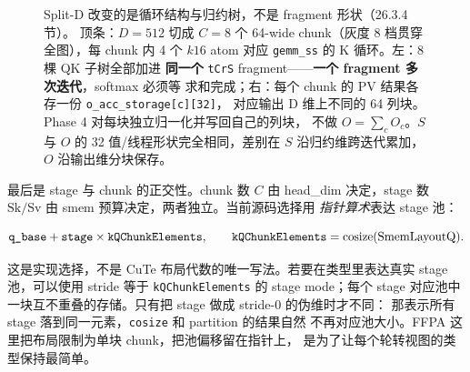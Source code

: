\begin{figure}[H]
\caption{Split-D 改变的是循环结构与归约树，不是 fragment 形状（26.3.4 节）。
顶条：$D=512$ 切成 $C=8$ 个 64-wide chunk（灰度 8 档贯穿全图），每 chunk 内
4 个 $k16$ atom 对应 \texttt{gemm\_ss} 的 K 循环。左：8 棵 QK 子树全部加进
\textbf{同一个} \texttt{tCrS} fragment——\textbf{一个 fragment 多次迭代}，softmax 必须等
求和完成；右：每个 chunk 的 PV 结果各存一份 \texttt{o\_acc\_storage[c][32]}，
对应输出 D 维上不同的 64 列块。Phase 4 对每块独立归一化并写回自己的列块，
不做 $O=\sum_c O_c$。$S$ 与 $O$ 的 32 值/线程形状完全相同，差别在
$S$ 沿归约维跨迭代累加，$O$ 沿输出维分块保存。}
\label{fig:26-splitd-struct}
\end{figure}

最后是 stage 与 chunk 的正交性。chunk 数 $C$ 由 head\_dim 决定，stage 数
$\mathrm{Sk}/\mathrm{Sv}$ 由 smem 预算决定，两者独立。当前源码选择用
\emph{指针算术}表达 stage 池：

\begin{equation}
  \texttt{q\_base} + \texttt{stage}\times \texttt{k\allowbreak{}QChunk\allowbreak{}Elements},
  \qquad
  \texttt{k\allowbreak{}QChunk\allowbreak{}Elements} = \mathrm{cosize}(\mathrm{SmemLayoutQ}) .
  \label{eq:26-stage}
\end{equation}

这是实现选择，不是 CuTe 布局代数的唯一写法。若要在类型里表达真实 stage
池，可以使用 stride 等于 \texttt{kQChunkElements} 的 stage mode；每个 stage
对应池中一块互不重叠的存储。只有把 stage 做成 stride-0 的伪维时才不同：
那表示所有 stage 落到同一元素，\texttt{cosize} 和 partition 的结果自然
不再对应池大小。FFPA 这里把布局限制为单块 chunk，把池偏移留在指针上，
是为了让每个轮转视图的类型保持最简单。

